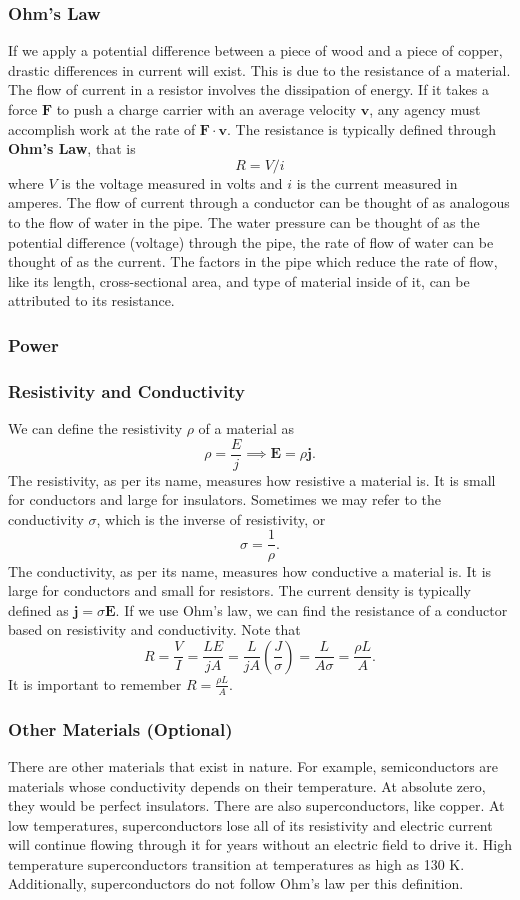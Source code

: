 \documentclass[12pt]{article}
\let\vec\mathbf
\begin{document}
  \subsubsection{Ohm's Law}
  If we apply a potential difference between a piece of wood and a piece of copper, drastic differences in current will exist. This is due to the resistance of a material. The flow of current in a resistor involves the dissipation of energy. If it takes a force $\vec F$ to push a charge carrier with an average velocity $\vec v$, any agency must accomplish work at the rate of $\vec F\cdot \vec v$. The resistance is typically defined through \textbf{Ohm's Law}, that is 
  \[R = V/i\]
  where $V$ is the voltage measured in volts and $i$ is the current measured in amperes. The flow of current through a conductor can be thought of as analogous to the flow of water in the pipe. The water pressure can be thought of as the potential difference (voltage) through the pipe, the rate of flow of water can be thought of as the current. The factors in the pipe which reduce the rate of flow, like its length, cross-sectional area, and type of material inside of it, can be attributed to its resistance.
  \subsubsection{Power}
  
  \subsubsection{Resistivity and Conductivity}
  We can define the resistivity $\rho$ of a material as 
  \[\rho = \frac{E}{j}\implies \vec E = \rho \vec j.\]
  The resistivity, as per its name, measures how resistive a material is. It is small for conductors and large for insulators. Sometimes we may refer to the conductivity $\sigma$, which is the inverse of resistivity, or 
  \[\sigma = \frac{1}{\rho}.\]
  The conductivity, as per its name, measures how conductive a material is. It is large for conductors and small for resistors. The current density is typically defined as $\vec j = \sigma \vec E.$ If we use Ohm's law, we can find the resistance of a conductor based on resistivity and conductivity. Note that 
  \[R = \frac{V}{I} = \frac{LE}{jA} = \frac{L}{jA}\left(\frac{J}{\sigma}\right) = \frac{L}{A\sigma} = \frac{\rho L}{A}.\]
  It is important to remember $R = \frac{\rho L}{A}$. 
  \subsubsection{Other Materials (Optional)}
  There are other materials that exist in nature. For example, semiconductors are materials whose conductivity depends on their temperature. At absolute zero, they would be perfect insulators. There are also superconductors, like copper. At low temperatures, superconductors lose all of its resistivity and electric current will continue flowing through it for years without an electric field to drive it. High temperature superconductors transition at temperatures as high as 130 K. Additionally, superconductors do not follow Ohm's law per this definition. 
\end{document}
